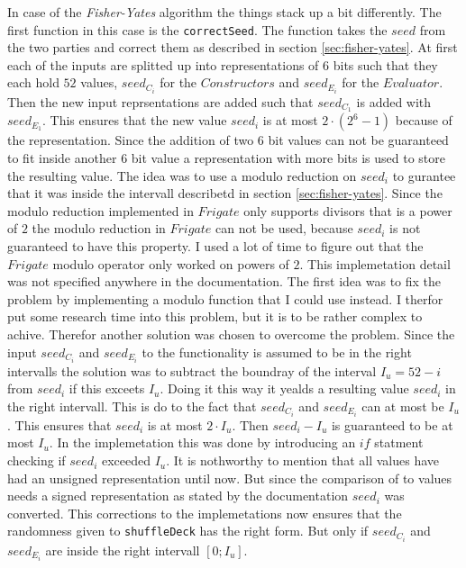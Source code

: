 \documentclass[twoside,11pt,openright]{report}
\newcommand{\FY}{\textit{Fisher-Yates} }
\begin{document}
In case of the \FY algorithm the things stack up a bit differently. The first function in this case is the \verb|correctSeed|. The function takes the $seed$ from the two parties and correct them as described in section \ref{sec:fisher-yates}. At first each of the inputs are splitted up into representations of $6$ bits such that they each hold $52$ values, $seed_{C_i}$ for the $Constructors$ and $seed_{E_i}$ for the $Evaluator$. Then the new input reprsentations are added such that $seed_{C_1}$ is added with $seed_{E_1}$. This ensures that the new value $seed_i$ is at most $2\cdot (2^6 - 1)$ because of the representation. Since the addition of two $6$ bit values can not be guaranteed to fit inside another $6$ bit value a representation with more bits is used to store the resulting value.
The idea was to use a modulo reduction on $seed_i$ to gurantee that it was inside the intervall describetd in section \ref{sec:fisher-yates}. Since the modulo reduction implemented in $Frigate$ only supports divisors that is a power of $2$ the modulo reduction in $Frigate$ can not be used, because $seed_i$ is not guaranteed to have this property. I used a lot of time to figure out that the $Frigate$ modulo operator only worked on powers of $2$. This implemetation detail was not specified anywhere in the documentation. The first idea was to fix the problem by implementing a modulo function that I could use instead. I therfor put some research time into this problem, but it is to be rather complex to achive. Therefor another solution was chosen to overcome the problem. Since the input $seed_{C_i}$ and $seed_{E_i}$ to the functionality is assumed to be in the right intervalls the solution was to subtract the boundray of the interval $I_u=52-i$ from $seed_i$ if this exceets $I_u$. Doing it this way it yealds a resulting value $seed_i$ in the right intervall. This is do to the fact that $seed_{C_i}$ and $seed_{E_i}$ can at most be $I_u$. This ensures that $seed_i$ is at most $2\cdot I_u$. Then $seed_i - I_u$ is guaranteed to be at most $I_u$.
In the implemetation this was done by introducing an $if$ statment checking if $seed_i$ exceeded $I_u$. It is nothworthy to mention that all values have had an unsigned representation until now. But since the comparison of to values needs a signed representation as stated by the documentation $seed_i$ was converted. This corrections to the implemetations now ensures that the randomness given to \verb|shuffleDeck| has the right form. But only if $seed_{C_i}$ and $seed_{E_i}$ are inside the right intervall $[0;I_u]$.
\end{document}
